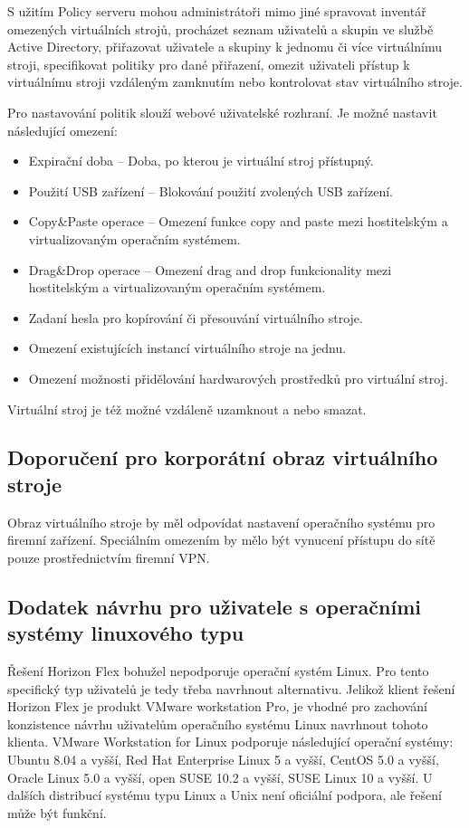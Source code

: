 S užitím Policy serveru mohou administrátoři mimo jiné spravovat inventář omezených virtuálních strojů, procházet seznam uživatelů a skupin ve službě Active Directory, přiřazovat uživatele a skupiny k jednomu či více virtuálnímu stroji, specifikovat politiky pro dané přiřazení, omezit uživateli přístup k virtuálnímu stroji vzdáleným zamknutím nebo kontrolovat stav virtuálního stroje.

Pro nastavování politik slouží webové uživatelské rozhraní. Je možné nastavit následující omezení:

\begin{itemize}
    \item Expirační doba -- Doba, po kterou je virtuální stroj přístupný.
    \item Použití USB zařízení -- Blokování použití zvolených USB zařízení.
    \item Copy\&Paste operace -- Omezení funkce copy and paste mezi hostitelským a virtualizovaným operačním systémem.
    \item Drag\&Drop operace -- Omezení drag and drop funkcionality mezi hostitelským a virtualizovaným operačním systémem.
    \item Zadaní hesla pro kopírování či přesouvání virtuálního stroje.
    \item Omezení existujících instancí virtuálního stroje na jednu.
    \item Omezení možnosti přidělování hardwarových prostředků pro virtuální stroj.
\end{itemize}

Virtuální stroj je též možné vzdáleně uzamknout a nebo smazat.

\subsection{Doporučení pro korporátní obraz virtuálního stroje}
Obraz virtuálního stroje by měl odpovídat nastavení operačního systému pro firemní zařízení. Speciálním omezením by mělo být vynucení přístupu do sítě pouze prostřednictvím firemní VPN.

\subsection{Dodatek návrhu pro uživatele s operačními systémy linuxového typu}
Řešení Horizon Flex bohužel nepodporuje operační systém Linux. Pro tento specifický typ uživatelů je tedy třeba navrhnout alternativu. Jelikož klient řešení Horizon Flex je produkt VMware workstation Pro, je vhodné pro zachování konzistence návrhu uživatelům operačního systému Linux navrhnout tohoto klienta. VMware Workstation for Linux podporuje následující operační systémy: Ubuntu 8.04 a vyšší, Red Hat Enterprise Linux 5 a vyšší, CentOS 5.0 a vyšší, Oracle Linux 5.0 a vyšší, open SUSE 10.2 a vyšší, SUSE Linux 10 a vyšší. U dalších distribucí systému typu Linux a Unix není oficiální podpora, ale řešení může být funkční.

